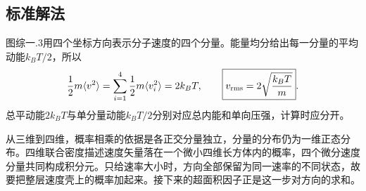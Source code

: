 \documentclass[UTF8,fontset=fandol,a4paper,11pt]{ctexart}
\begin{document}

\subsection*{标准解法}


图综一.3用四个坐标方向表示分子速度的四个分量。能量均分给出每一分量的平均动能$k_BT/2$，所以
\[
\frac12m\langle v^2\rangle
=\sum_{i=1}^4\frac12m\langle v_i^2\rangle=2k_BT,
\qquad
\boxed{v_{\rm rms}=2\sqrt{\frac{k_BT}{m}}}.
\]
总平动能$2k_BT$与单分量动能$k_BT/2$分别对应总内能和单向压强，计算时应分开。

从三维到四维，概率相乘的依据是各正交分量独立，分量的分布仍为一维正态分布。四维联合密度描述速度矢量落在一个微小四维长方体内的概率，四个微分速度分量共同构成积分元。只给速率大小时，方向全部保留为同一速率的不同状态，故要把整层速度壳上的概率加起来。接下来的超面积因子正是这一步对方向的求和。
\end{document}
